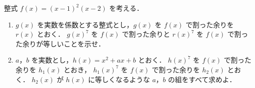 ﻿\documentclass[../../../uem_tok_q.tex]{subfiles}
\begin{document}
    整式 $f(x)=(x-1)^2(x-2)$ を考える．

    \begin{enumerate}
        \item $g(x)$ を実数を係数とする整式とし，$g(x)$ を $f(x)$ で割った余りを $r(x)$ とおく．%
            $g(x)^7$ を $f(x)$ で割った余りと $r(x)^7$ を $f(x)$ で割った余りが等しいことを示せ．
        \item $a$，$b$ を実数とし，$h(x)=x^2+ax+b$ とおく．%
            $h(x)^7$ を $f(x)$ で割った余りを $h_1(x)$ とおき，%
            $h_1(x)^7$ を $f(x)$ で割った余りを $h_2(x)$ とおく．%
            $h_2(x)$ が $h(x)$ に等しくなるような $a$，$b$ の組をすべて求めよ．
    \end{enumerate}
\end{document}
